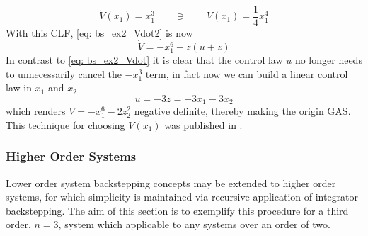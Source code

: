 \documentclass[12pt]{ucthesis}
\begin{document}
\begin{eg}
		\begin{equation} \label{eq: bs_ex2_niceeee}
			\dot{V}(x_1) = x_1^3 \qquad \ni \qquad V(x_1) = \frac{1}{4}x_1^4
		\end{equation}
	With this CLF, \ref{eq: bs_ex2_Vdot2} is now
		\begin{equation} \label{eq: bs_ex2_Vdot3}
			\dot{V} = -x_1^6 + z(u+z)
		\end{equation}	
	In contrast to \autoref{eq: bs_ex2_Vdot} it is clear that the control law $u$ no longer needs to unnecessarily cancel the $-x_1^3$ term, in fact now we can build a linear control law in $x_1$ and $x_2$
		\begin{equation} \label{eq: bs_ex2_u2}
			u = -3z = -3x_1 -3x_2
		\end{equation}
	which renders $\dot{V} = -x_1^6 - 2z_2^2$ negative definite, thereby making the origin GAS. This technique for choosing $V(x_1)$ was published in \citet{Krstic1998}.
\end{eg}

\subsubsection{Higher Order Systems}
\label{subsub: backstep_higher}

Lower order system backstepping concepts may be extended to higher order systems, for which simplicity is maintained via recursive application of integrator backstepping. The aim of this section is to exemplify this procedure for a third order, $n=3$, system which applicable to any systems over an order of two.
\end{document}

